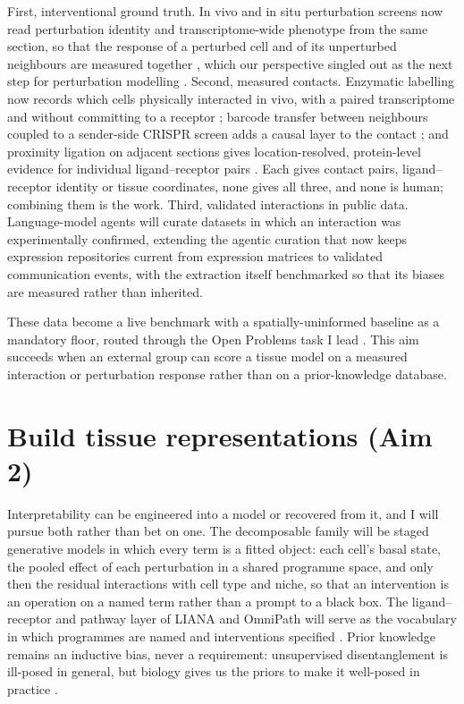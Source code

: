 \documentclass[11pt,a4paper]{article}
\begin{document}
First, interventional ground truth. In vivo and in situ perturbation screens now read perturbation identity and transcriptome-wide phenotype from the same section, so that the response of a perturbed cell and of its unperturbed neighbours are measured together \citep{dhainaut2022perturbmap, gu2025crisprmap, binan2025perturbfish, shen2026spatialperturbseq, baysoy2026perturbdbit, breinig2026perturbcast}, which our perspective singled out as the next step for perturbation modelling \citep{dimitrov2026interpretation}. Second, measured contacts. Enzymatic labelling now records which cells physically interacted in vivo, with a paired transcriptome and without committing to a receptor \citep{pasqual2018lipstic, nakandakarihiga2024ulipstic}; barcode transfer between neighbours coupled to a sender-side CRISPR screen adds a causal layer to the contact \citep{du2026matchseq}; and proximity ligation on adjacent sections gives location-resolved, protein-level evidence for individual ligand--receptor pairs \citep{liu2026cytosignal}. Each gives contact pairs, ligand--receptor identity or tissue coordinates, none gives all three, and none is human; combining them is the work. Third, validated interactions in public data. Language-model agents will curate datasets in which an interaction was experimentally confirmed, extending the agentic curation that now keeps expression repositories current \citep{youngblut2026scbasecount} from expression matrices to validated communication events, with the extraction itself benchmarked so that its biases are measured rather than inherited.

These data become a live benchmark with a spatially-uninformed baseline as a mandatory floor, routed through the Open Problems task I lead \citep{luecken2025openproblems}. This aim succeeds when an external group can score a tissue model on a measured interaction or perturbation response rather than on a prior-knowledge database.

\section{Build tissue representations (Aim 2)}

Interpretability can be engineered into a model or recovered from it, and I will pursue both rather than bet on one. The decomposable family will be staged generative models in which every term is a fitted object: each cell's basal state, the pooled effect of each perturbation in a shared programme space, and only then the residual interactions with cell type and niche, so that an intervention is an operation on a named term rather than a prompt to a black box. The ligand--receptor and pathway layer of LIANA and OmniPath will serve as the vocabulary in which programmes are named and interventions specified \citep{dimitrov2024lianaplus, turei2021omnipath}. Prior knowledge remains an inductive bias, never a requirement: unsupervised disentanglement is ill-posed in general, but biology gives us the priors to make it well-posed in practice \citep{piran2024biolord, dong2025simvi}.
\end{document}
